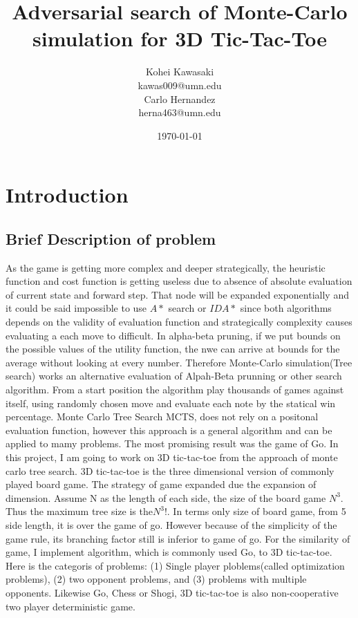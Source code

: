 \documentclass[11pt]{article}
\title{Adversarial search of Monte-Carlo simulation for 3D Tic-Tac-Toe}
\author{
Kohei Kawasaki\\kawas009@umn.edu\\
Carlo Hernandez\\herna463@umn.edu
}
\date{\today}
\begin{document}
\maketitle
\label{sec:rw}
\section{Introduction}

\subsection{Brief Description of problem}
As the game is getting more complex and deeper strategically, the heuristic function and cost function is getting useless due to absence of absolute evaluation of current state and forward step. That node will be expanded exponentially and it could be said impossible to use \(A*\) search or \(IDA*\) since both algorithms depends on the validity of evaluation function and strategically complexity causes evaluating a each move to difficult. In alpha-beta pruning, if we put bounds on the possible values of the utility function, the nwe can arrive at bounds for the average without looking at every number.
Therefore Monte-Carlo simulation(Tree search) works an alternative evaluation of Alpah-Beta prunning or other search algorithm. From a start position the algorithm play thousands of games against itself, using randomly chosen move and evaluate each note by the statical win percentage. Monte Carlo Tree Search MCTS, does not rely on a positonal evaluation function, however this approach is a general algorithm and can be applied to mamy problems. The most promising result was the game of Go. In this project, I am going to work on 3D tic-tac-toe from the approach of monte carlo tree search. 3D tic-tac-toe is the three dimensional version of commonly played board game. The strategy of game expanded due the expansion of dimension. Assume N as the length of each side, the size of the board game \(N^3\). Thus the maximum tree size is the\(N^3!\). In terms only size of board game, from 5 side length, it is over the game of go. However because of the simplicity of the game rule, its branching factor still is inferior to game of go. For the similarity of game, I implement algorithm, which is commonly used Go, to 3D tic-tac-toe. Here is the categoris of problems: (1) Single player ploblems(called optimization problems), (2) two opponent problems, and (3) problems with multiple opponents. Likewise Go, Chess or Shogi, 3D tic-tac-toe is also non-cooperative two player deterministic game. 
\end{document}
